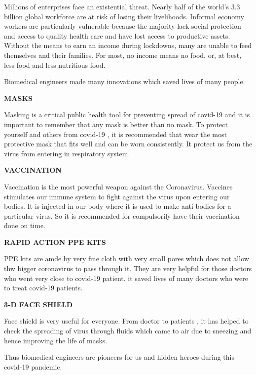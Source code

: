 \documentclass[12pt,a4paper]{report}
\begin{document}
Millions of enterprises face an existential threat. Nearly half of the world’s 3.3 billion global workforce are at risk of losing their livelihoods. Informal economy workers are particularly vulnerable because the majority lack social protection and access to quality health care and have lost access to productive assets. Without the means to earn an income during lockdowns, many are unable to feed themselves and their families. For most, no income means no food, or, at best, less food and less nutritious food.\par

Biomedical engineers made many innovations which saved lives of many people.\par
\begin{center}
  \small{\textbf{MASKS }}
\end{center}

Masking is a critical public health tool for preventing spread of covid-19 and it is important to remember that any mask is better than no mask. To protect yourself and others from covid-19 , it is recommended  that wear the most protective mask that fits well and can be worn consistently. It protect us from the virus from entering in respiratory system.\par 

\begin{center}
  \small{\textbf{VACCINATION }}
\end{center}

Vaccination is the most powerful weapon against the Coronavirus. Vaccines stimulates our immune system to fight against the virus upon entering our bodies. It is injected in our body where it is used to make anti-bodies for a particular virus. So it is recommended for compulsorily have their vaccination done on time.\par

\begin{center}
  \small{\textbf{RAPID ACTION PPE KITS}}
\end{center}

PPE kits are amde by very fine cloth with very small pores which does  not allow thw bigger coronavirus to pass through it.  They are very helpful for those doctors who went very close to covid-19  patient. it saved lives of many doctors who were to treat covid-19 patients.\par
 
\begin{center}
  \small{\textbf{3-D FACE SHIELD}}
\end{center}

Face shield is very useful for everyone. From doctor to patients , it has helped to check the spreading of virus through fluids which came to air due to sneezing and hence improving the life of masks.\par

Thus biomedical engineers are pioneers for us and hidden heroes during this covid-19 pandemic. 
\end{document}

